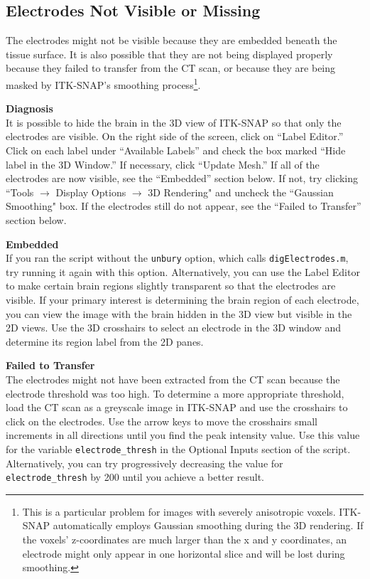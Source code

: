 \documentclass[12pt]{article}
\begin{document}
\subsection{Electrodes Not Visible or Missing}
The electrodes might not be visible because they are embedded beneath the tissue surface. It is also possible that they are not being displayed properly because they failed to transfer from the CT scan, or because they are being masked by ITK-SNAP's smoothing process\footnote{This is a particular problem for images with severely anisotropic voxels. ITK-SNAP automatically employs Gaussian smoothing during the 3D rendering. If the voxels' z-coordinates are much larger than the x and y coordinates, an electrode might only appear in one horizontal slice and will be lost during smoothing.}. 

\textbf{Diagnosis}\\ It is possible to hide the brain in the 3D view of ITK-SNAP so that only the electrodes are visible. On the right side of the screen, click on ``Label Editor.'' Click on each label under ``Available Labels'' and check the box marked ``Hide label in the 3D Window.'' If necessary, click ``Update Mesh.'' If all of the electrodes are now visible, see the ``Embedded'' section below.  If not, try clicking ``Tools $\rightarrow$ Display Options $\rightarrow$ 3D Rendering" and uncheck the ``Gaussian Smoothing" box. If the electrodes still do not appear, see the ``Failed to Transfer'' section below.

\textbf{Embedded}\\
If you ran the script without the \texttt{unbury} option, which calls \texttt{digElectrodes.m}, try running it again with this option. Alternatively, you can use the Label Editor to make certain brain regions slightly transparent so that the electrodes are visible. If your primary interest is determining the brain region of each electrode, you can view the image with the brain hidden in the 3D view but visible in the 2D views. Use the 3D crosshairs to select an electrode in the 3D window and determine its region label from the 2D panes. 

\textbf{Failed to Transfer}\\
The electrodes might not have been extracted from the CT scan because the electrode threshold was too high. To determine a more appropriate threshold, load the CT scan as a greyscale image in ITK-SNAP and use the crosshairs to click on the electrodes. Use the arrow keys to move the crosshairs small increments in all directions until you find the peak intensity value. Use this value for the variable \texttt{electrode\_thresh} in the Optional Inputs section of the script. Alternatively, you can try progressively decreasing the value for \texttt{electrode\_thresh} by 200 until you achieve a better result.
\end{document}
